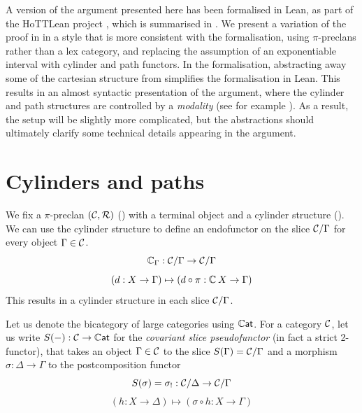 A version of the argument presented here has been formalised in Lean,
as part of the HoTTLean project \cite{hua2025},
which is summarised in .
We present a variation of the proof in \cite{awodey2026} in a style
that is more consistent with the formalisation,
using $\pi$-preclans rather than a lex category,
and replacing the assumption of an exponentiable interval with
cylinder and path functors.
In the formalisation,
abstracting away some of the cartesian structure
from \cite{awodey2026} simplifies the formalisation in Lean.
This results in an almost syntactic presentation of the argument,
where the cylinder and path structures are controlled by a \emph{modality}
(see for example \cite{licata2016, licata2017, gratzer2020, shulman2023}).
As a result, the setup will be slightly more complicated,
but the abstractions should ultimately clarify some technical
details appearing in the argument.

\section{Cylinders and paths}

We fix a $\pi$-preclan $(\CC,\RR)$ () with a terminal object
and a cylinder structure ().
We can use the cylinder structure
to define an endofunctor on the slice $\CC / \Gamma$
for every object $\Gamma \in \CC$.
\[
   \cyl[\Gamma] : \CC / \Gamma \to \CC / \Gamma
\]
\[
  (d : X \to \Gamma) \mapsto (d \circ \pi : \cyl X \to \Gamma)
\]
This results in a {cylinder structure in each slice $\CC / \Gamma$}.

Let us denote the bicategory of large categories using $\tcat$.
For a category $\CC$,
let us write $S(-) : \CC \to \tcat$
for the \emph{covariant slice pseudofunctor} (in fact a strict 2-functor),
that takes an object $\Gamma \in \CC$ to the slice
$S(\Gamma) = \CC / \Gamma$ and a morphism $\sigma : \Delta \to \Gamma$
to the postcomposition functor
\[ S(\sigma) = \sigma_! : \CC / \Delta \to \CC / \Gamma\]
\[ (h : X \to \Delta) \mapsto (\sigma \circ h : X \to \Gamma)\]

